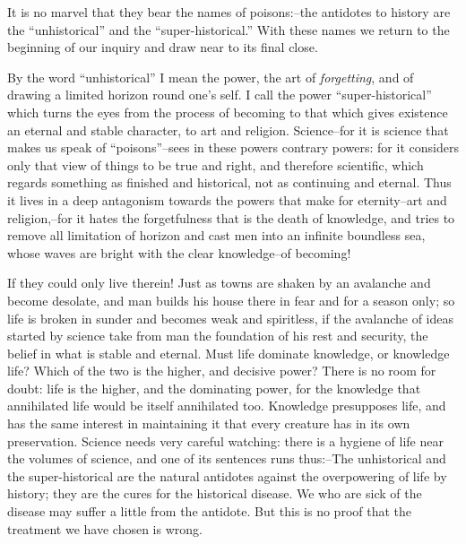 It is no marvel that they bear the names of poisons:--the antidotes
to history are the \enquote{unhistorical} and the \enquote{super-historical.} With
these names we return to the beginning of our inquiry and draw near
to its final close.

By the word \enquote{unhistorical} I mean the power, the art of \textit{forgetting},
and of drawing a limited horizon round one's self. I call the power
\enquote{super-historical} which turns the eyes from the process of becoming
to that which gives existence an eternal and stable character, to art
and religion. Science--for it is science that makes us speak of
\enquote{poisons}--sees in these powers contrary powers: for it considers
only that view of things to be true and right, and therefore
scientific, which regards something as finished and historical, not
as continuing and eternal. Thus it lives in a deep antagonism towards
the powers that make for eternity--art and religion,--for it hates
the forgetfulness that is the death of knowledge, and tries to remove
all limitation of horizon and cast men into an infinite boundless
sea, whose waves are bright with the clear knowledge--of becoming!

If they could only live therein! Just as towns are shaken by an
avalanche and become desolate, and man builds his house there in fear
and for a season only; so life is broken in sunder and becomes weak
and spiritless, if the avalanche of ideas started by science take
from man the foundation of his rest and security, the belief in what
is stable and eternal. Must life dominate knowledge, or knowledge
life? Which of the two is the higher, and decisive power? There is no
room for doubt: life is the higher, and the dominating power, for the
knowledge that annihilated life would be itself annihilated too.
Knowledge presupposes life, and has the same interest in maintaining
it that every creature has in its own preservation. Science needs
very careful watching: there is a hygiene of life near the volumes of
science, and one of its sentences runs thus:--The unhistorical and
the super-historical are the natural antidotes against the
overpowering of life by history; they are the cures for the
historical disease. We who are sick of the disease may suffer a
little from the antidote. But this is no proof that the treatment we
have chosen is wrong.

